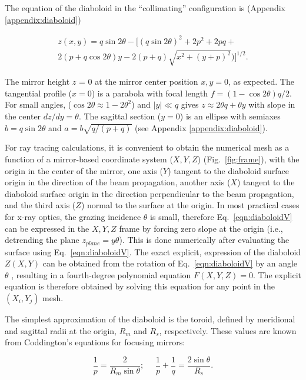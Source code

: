 \documentclass{iucr}       %
\begin{document}
The equation of the diaboloid in the ``collimating'' configuration is (Appendix \ref{appendix:diaboloid})

\begin{multline}
\label{eqn:diaboloidV}
z(x,y) = q \sin2\theta - 
[ (q \sin{2\theta})^2 + 2p^2 + 2 p q + \\
2 (p + q \cos{2\theta}) y - 2 (p+q) \sqrt{x^2 + (y + p)^2}) ]^{1/2}.
\end{multline}

The mirror height $z$ = 0 at the mirror center position $x, y = 0$, as expected. The tangential profile ($x=0$) is a parabola with focal length $ f = (1-\cos2\theta) q/2$. For small angles, ($\cos2\theta\approx 1 - 2\theta^2$) and $|y|\ll q$ gives $z\approx 2 \theta q + \theta y$ with slope in the center $dz/dy=\theta$. The sagittal section ($y=0$) is an ellipse with semiaxes $b=q \sin2\theta$ and $a=b \sqrt{q /(p+q)}$ (see Appendix \ref{appendix:diaboloid}). 

For ray tracing calculations, it is convenient to obtain the numerical mesh as a function of a mirror-based coordinate system ($X,Y,Z$) (Fig.~\ref{fig:frame}), with the origin in the center of the mirror, one axis ($Y$) tangent to the diaboloid surface origin in the direction of the beam propagation, another axis ($X$) tangent to the diaboloid surface origin in the direction perpendicular to the beam propagation, and the third axis ($Z$) normal to the surface at the origin. In most practical cases for x-ray optics, the grazing incidence $\theta$ is small, therefore Eq.~\ref{eqn:diaboloidV} can be expressed in the $X,Y,Z$ frame by forcing zero slope at the origin (i.e., detrending the plane $z_{plane}=y \theta$). This is done numerically after evaluating the surface using Eq.~\ref{eqn:diaboloidV}. The exact explicit, expression of the diaboloid $Z(X,Y)$ can be obtained from the rotation of Eq.~\ref{eqn:diaboloidV} by an angle $\theta$ \cite{part2}, resulting in a fourth-degree polynomial equation $F(X,Y,Z)=0$. The explicit equation is therefore obtained by solving this equation for any point in the $(X_i,Y_j)$ mesh.

The simplest approximation of the diaboloid is the toroid, defined by meridional and sagittal radii at the origin, $R_m$ and $R_s$, respectively. These values are known from Coddington's equations for focusing mirrors:

\begin{equation}
\label{eqn:radii}
\frac{1}{p} = \frac{2 }{R_m \sin\theta };~~~~~~
\frac{1}{p} + \frac{1}{q} = \frac{2\sin\theta}{ R_s}.
\end{equation}
\end{document}
